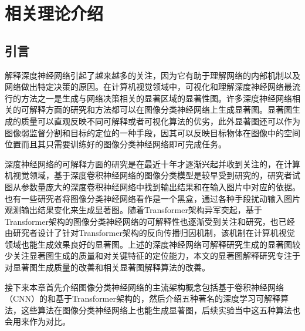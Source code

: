 


\chapter{相关理论介绍
}
\thispagestyle{others}
\pagestyle{others}
\xiaosi

\section{引言}
解释深度神经网络引起了越来越多的关注，因为它有助于理解网络的内部机制以及网络做出特定决策的原因。在计算机视觉领域中，可视化和理解深度神经网络最流行的方法之一是生成与网络决策相关的显著区域的显著性图。许多深度神经网络相关的可解释方面的研究和方法都可以在图像分类神经网络上生成显著图。显著图生成的质量可以直观反映不同可解释或者可视化算法的优劣，此外显著图还可以作为图像弱监督分割和目标的定位的一种手段，因其可以反映目标物体在图像中的空间位置而且其只需要训练好的图像分类神经网络即可完成任务。


深度神经网络的可解释方面的研究是在最近十年才逐渐兴起并收到关注的，在计算机视觉领域，基于深度卷积神经网络的图像分类模型是较早受到研究的，研究者试图从参数量庞大的深度卷积神经网络中找到输出结果和在输入图片中对应的依据。也有一些研究者将图像分类神经网络看作是一个黑盒，通过各种手段扰动输入图片观测输出结果变化来生成显著图。随着Transformer架构异军突起，基于Transformer架构的图像分类神经网络的可解释性也逐渐受到关注和研究，也已经由研究者设计了针对Transformer架构的反向传播归因机制，该机制在计算机视觉领域也能生成效果良好的显著图。上述的深度神经网络可解释研究生成的显著图较少关注显著图生成的质量和对关键特征的定位能力，本文的显著图解释研究专注于对显著图生成质量的改善和相关显著图解释算法的改善。

接下来本章首先介绍图像分类神经网络的主流架构概念包括基于卷积神经网络（CNN）的和基于Transformer架构的，然后介绍五种著名的深度学习可解释算法，这些算法在图像分类神经网络上也能生成显著图，后续实验当中这五种算法也会用来作为对比。

